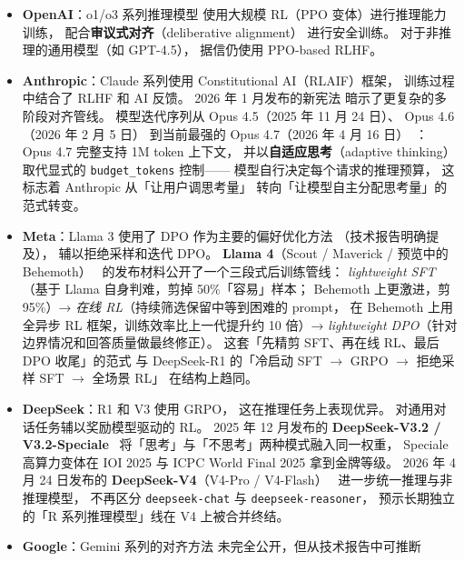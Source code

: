 \begin{itemize}[noitemsep]
  \item \textbf{OpenAI}：o1/o3 系列推理模型
        使用大规模 RL（PPO 变体）进行推理能力训练，
        配合\textbf{审议式对齐}（deliberative alignment）
        进行安全训练。
        对于非推理的通用模型（如 GPT-4.5），
        据信仍使用 PPO-based RLHF。
  \item \textbf{Anthropic}：Claude 系列使用
        Constitutional AI（RLAIF）框架，
        训练过程中结合了 RLHF 和 AI 反馈。
        2026 年 1 月发布的新宪法
        暗示了更复杂的多阶段对齐管线。
        模型迭代序列从 Opus 4.5（2025 年 11 月 24 日）、
        Opus 4.6（2026 年 2 月 5 日）
        到当前最强的 Opus 4.7（2026 年 4 月 16 日）~\cite{anthropic2026claude47}：
        Opus 4.7 完整支持 1M token 上下文，
        并以\textbf{自适应思考}（adaptive thinking）取代显式的 \texttt{budget\_tokens} 控制——
        模型自行决定每个请求的推理预算，
        这标志着 Anthropic 从「让用户调思考量」
        转向「让模型自主分配思考量」的范式转变。
  \item \textbf{Meta}：Llama 3 使用了
        DPO 作为主要的偏好优化方法
       （技术报告明确提及），
        辅以拒绝采样和迭代 DPO。
        \textbf{Llama 4}（Scout / Maverick / 预览中的 Behemoth）~\cite{meta2025llama4}
        的发布材料公开了一个三段式后训练管线：
        \emph{lightweight SFT}（基于 Llama 自身判难，剪掉 50\%「容易」样本；
        Behemoth 上更激进，剪 95\%）→
        \emph{在线 RL}（持续筛选保留中等到困难的 prompt，
        在 Behemoth 上用全异步 RL 框架，训练效率比上一代提升约 10 倍）→
        \emph{lightweight DPO}（针对边界情况和回答质量做最终修正）。
        这套「先精剪 SFT、再在线 RL、最后 DPO 收尾」的范式
        与 DeepSeek-R1 的「冷启动 SFT $\to$ GRPO $\to$ 拒绝采样 SFT $\to$ 全场景 RL」
        在结构上趋同。
  \item \textbf{DeepSeek}：R1 和 V3 使用 GRPO，
        这在推理任务上表现优异。
        对通用对话任务辅以奖励模型驱动的 RL。
        2025 年 12 月发布的 \textbf{DeepSeek-V3.2 / V3.2-Speciale}~\cite{deepseek2025v32}
        将「思考」与「不思考」两种模式融入同一权重，
        Speciale 高算力变体在 IOI 2025 与 ICPC World Final 2025 拿到金牌等级。
        2026 年 4 月 24 日发布的 \textbf{DeepSeek-V4}（V4-Pro / V4-Flash）~\cite{deepseek2026v4}
        进一步统一推理与非推理模型，
        不再区分 \texttt{deepseek-chat} 与 \texttt{deepseek-reasoner}，
        预示长期独立的「R 系列推理模型」线在 V4 上被合并终结。
  \item \textbf{Google}：Gemini 系列的对齐方法
        未完全公开，但从技术报告中可推断

\end{itemize}
